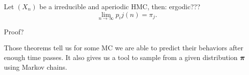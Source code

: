 	\begin{theorem}
		Let $(X_n)$ be a irreducible and aperiodic HMC, then: ergodic???
		\begin{equation*}
			\lim_{n \rightarrow \infty} p_ij(n) = \pi_j.
		\end{equation*}
	\end{theorem}
	Proof?
	
	Those theorems tell us for some MC we are able to predict their behaviors after enough time passes. It also gives us a tool to sample from a given distribution $\boldsymbol{\pi}$ using Markov chains.
	